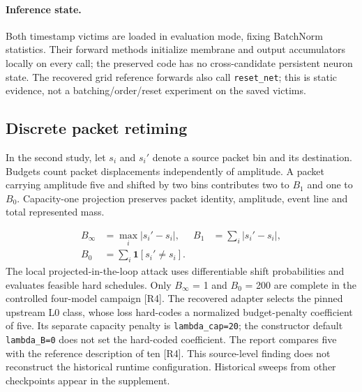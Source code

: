 \paragraph{Inference state.}
Both timestamp victims are loaded in evaluation mode, fixing BatchNorm statistics. Their forward methods initialize membrane and output accumulators locally on every call; the preserved code has no cross-candidate persistent neuron state. The recovered grid reference forwards also call \texttt{reset\_net}; this is static evidence, not a batching/order/reset experiment on the saved victims.

\subsection{Discrete packet retiming}
In the second study, let $s_i$ and $s_i'$ denote a source packet bin and its destination. Budgets count packet displacements independently of amplitude. A packet carrying amplitude five and shifted by two bins contributes two to $B_1$ and one to $B_0$. Capacity-one projection preserves packet identity, amplitude, event line and total represented mass.


\begin{equation}\label{eq:budgets}
\begin{aligned}
B_{\infty}&=\max_i|s_i'-s_i|, & B_1&=\sum_i|s_i'-s_i|,\\
B_0&=\sum_i\mathbf{1}[s_i'\neq s_i].
\end{aligned}
\end{equation}
The local projected-in-the-loop attack uses differentiable shift probabilities and evaluates feasible hard schedules. Only $B_\infty$ = 1 and $B_0$ = 200 are complete in the controlled four-model campaign [R4]. The recovered adapter selects the pinned upstream L0 class, whose loss hard-codes a normalized budget-penalty coefficient of five. Its separate capacity penalty is \texttt{lambda\_cap=20}; the constructor default \texttt{lambda\_B=0} does not set the hard-coded coefficient. The report compares five with the reference description of ten [R4]. This source-level finding does not reconstruct the historical runtime configuration. Historical sweeps from other checkpoints appear in the supplement.
